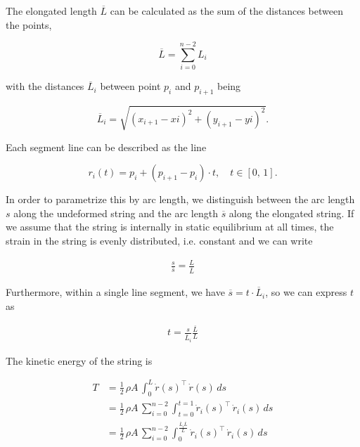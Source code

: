 \newpage

The elongated length $\overline{L}$ can be calculated as the sum of the distances between the points,

$$
\overline{L} = \sum_{i=0}^{n-2} L_{i}
$$

with the distances $\overline{L}_{i}$ between point $p_{i}$ and $p_{i+1}$ being

$$
\overline{L}_{i} = \sqrt{(x_{i+1} - x{i})^2 + (y_{i+1} - y{i})^2}.
$$

Each segment line can be described as the line

$$
r_{i}(t) = p_{i} + (p_{i+1} - p_{i}) \cdot t, \quad t \in [0,\,1].
$$

In order to parametrize this by arc length, we distinguish between the arc length $s$ along the undeformed string and the arc length $\overline{s}$ along the elongated string.
If we assume that the string is internally in static equilibrium at all times, the strain in the string is evenly distributed, i.e. constant and we can write

\begin{align*}
\frac{s}{\overline{s}} = \frac{L}{\overline{L}}
\end{align*}

Furthermore, within a single line segment, we have $\overline{s} = t \cdot \overline{L}_{i}$, so we can express $t$ as

\begin{align*}
t = \frac{s}{\overline{L}_{i}}\frac{\overline{L}}{L}
\end{align*}

The kinetic energy of the string is

\begin{align*}
T &= \frac{1}{2}\,\rho A \, \int_{0}^{L} \dot{r}(s)^\intercal\,\dot{r}(s)\,ds \\
&= \frac{1}{2}\,\rho A \, \sum_{i=0}^{n-2} \int_{t=0}^{t=1} \dot{r}_{i}(s)^\intercal\,\dot{r}_{i}(s)\,ds \\
&= \frac{1}{2}\,\rho A \, \sum_{i=0}^{n-2} \int_{0}^{\frac{\overline{L}_{i}\overline{L}}{L}} \dot{r}_{i}(s)^\intercal\,\dot{r}_{i}(s)\,ds \\
\end{align*}



